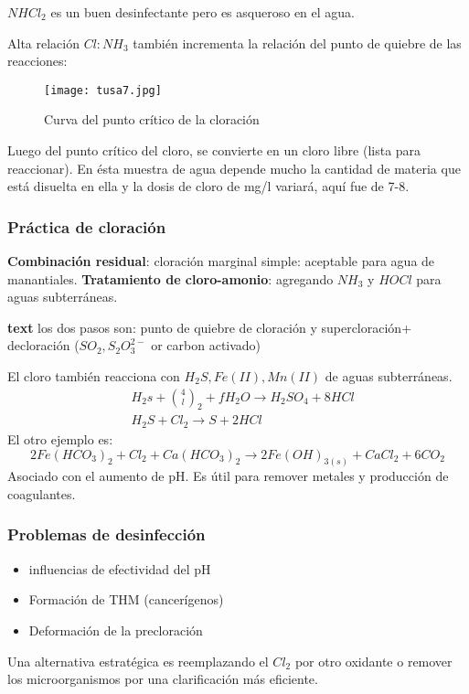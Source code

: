 $NHCl_2$ es un buen desinfectante pero es asqueroso en el agua.

Alta relación $Cl:NH_3$ también incrementa la relación del punto de quiebre de las reacciones:
\begin{figure}[h!]
\centering
  \texttt{[image: tusa7.jpg]}
  \caption{Curva del punto crítico de la cloración}
  \label{tusa7}
\end{figure}
Luego del punto crítico del cloro, se convierte en un cloro libre (lista para reaccionar). En ésta muestra de agua depende mucho la cantidad de materia que está disuelta en ella y la dosis de cloro de mg/l variará, aquí fue de 7-8.

\subsubsection{Práctica de cloración}
\textbf{Combinación residual}: cloración marginal simple: aceptable para agua de manantiales. \textbf{Tratamiento de cloro-amonio}: agregando $NH_3$ y $HOCl$ para aguas subterráneas.

\textbf{text} los dos pasos son: punto de quiebre de cloración y supercloración+ decloración ($SO_2, S_2O_3^{2-}$ or carbon activado)

El cloro también reacciona con $H_2S,Fe(II),Mn(II)$ de aguas subterráneas.
\begin{align*}
    &H_2s + \binom{4}{l}_2 + fH_2O\longrightarrow H_2SO_4 + 8HCl\\
    &H_2S + Cl_2\longrightarrow S + 2HCl
\end{align*}
El otro ejemplo es:
\begin{equation*}
    2Fe(HCO_3)_2 + Cl_2 + Ca(HCO_3)_2\longrightarrow 2Fe(OH)_{3(s)} + CaCl_2 + 6CO_2
\end{equation*}
Asociado con el aumento de pH. Es útil para remover metales y producción de coagulantes.
\subsubsection{Problemas de desinfección}
\begin{itemize}
    \item influencias de efectividad del pH
    \item Formación de THM (cancerígenos)
    \item Deformación de la precloración
\end{itemize}
Una alternativa estratégica es reemplazando el $Cl_2$ por otro oxidante o remover los microorganismos por una clarificación más eficiente.


